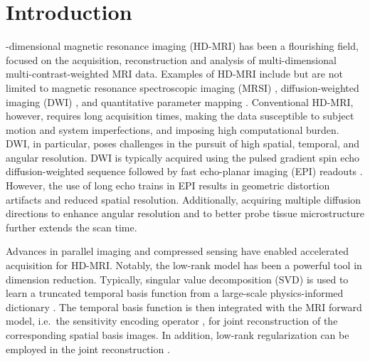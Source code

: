 \documentclass[journal,twoside,web]{ieeecolor}
\begin{document}
	\section{Introduction}
	\label{SEC:INTRO}
	-dimensional magnetic resonance imaging (HD-MRI)
	has been a flourishing field,
	focused on the acquisition, reconstruction and analysis of
	multi-dimensional multi-contrast-weighted MRI data.
	Examples of HD-MRI include but are not limited to
	magnetic resonance spectroscopic imaging (MRSI)
	\cite{brown_1982_mrsi},
	diffusion-weighted imaging (DWI)
	\cite{lebihan_1986_diff,merboldt_1985_diff},
	and quantitative parameter mapping
	\cite{doneva_2010_moba,ma_2013_mrf}.
	Conventional HD-MRI, however, requires long acquisition times,
	making the data susceptible to subject motion
	and system imperfections, and imposing high computational burden.
	DWI, in particular, poses challenges in the pursuit of
	high spatial, temporal, and angular resolution.
	DWI is typically acquired using
	the pulsed gradient spin echo diffusion-weighted sequence 
	\cite{stejskal_1965_pgse}
	followed by fast echo-planar imaging (EPI) readouts
	\cite{mansfield_1977_epi}.
	However, the use of long echo trains in EPI results in
	geometric distortion artifacts and reduced spatial resolution.
	Additionally, acquiring multiple diffusion directions
	to enhance angular resolution and
	to better probe tissue microstructure further extends the scan time.

	Advances in parallel imaging
	\cite{roemer_1990_pi,sodickson_1997_smash,
	pruessmann_1999_sense,pruessmann_2001_gsense,griswold_2002_grappa}
	and compressed sensing
	\cite{lustig_2007_cs,block_2007_cs,liang_2007_psf}
	have enabled accelerated acquisition for HD-MRI.
	Notably, the low-rank model \cite{cai_2010_svt}
	has been a powerful tool in dimension reduction.
	Typically, singular value decomposition (SVD) is used to
	learn a truncated temporal basis function from
	a large-scale physics-informed dictionary
	\cite{huang_2012_t2basis,lam_2014_spice,mcgivney_2014_svdmrf}.
	The temporal basis function is then integrated
	with the MRI forward model,
	i.e.~the sensitivity encoding operator \cite{pruessmann_2001_gsense},
	for joint reconstruction of the corresponding spatial basis images.
	In addition, low-rank regularization can be employed
	in the joint reconstruction \cite{tamir_2017_t2shuffling}.
\end{document}
